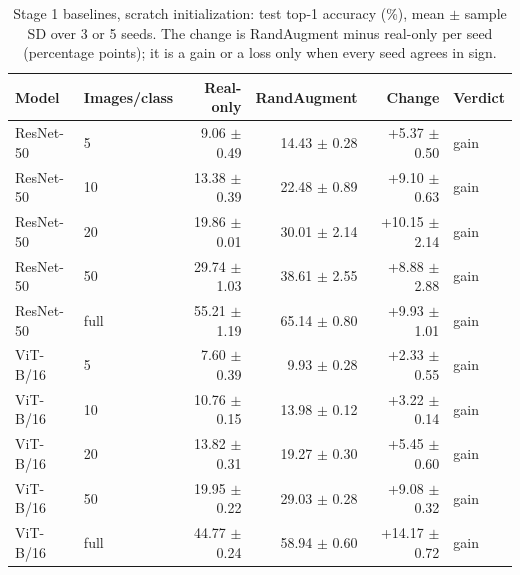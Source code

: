 \begin{table}[H]
\centering
\caption{Stage 1 baselines, scratch initialization: test top-1 accuracy (\%), mean $\pm$ sample SD over 3 or 5 seeds. The change is RandAugment minus real-only per seed (percentage points); it is a gain or a loss only when every seed agrees in sign.}
\label{tab:stage1-scratch-accuracy-test}
\begin{tabular}{llrrrl}
\toprule
Model & Images/class & Real-only & RandAugment & Change & Verdict \\
\midrule
ResNet-50 & 5 & 9.06 $\pm$ 0.49 & 14.43 $\pm$ 0.28 & +5.37 $\pm$ 0.50 & gain \\
ResNet-50 & 10 & 13.38 $\pm$ 0.39 & 22.48 $\pm$ 0.89 & +9.10 $\pm$ 0.63 & gain \\
ResNet-50 & 20 & 19.86 $\pm$ 0.01 & 30.01 $\pm$ 2.14 & +10.15 $\pm$ 2.14 & gain \\
ResNet-50 & 50 & 29.74 $\pm$ 1.03 & 38.61 $\pm$ 2.55 & +8.88 $\pm$ 2.88 & gain \\
ResNet-50 & full & 55.21 $\pm$ 1.19 & 65.14 $\pm$ 0.80 & +9.93 $\pm$ 1.01 & gain \\
\midrule
ViT-B/16 & 5 & 7.60 $\pm$ 0.39 & 9.93 $\pm$ 0.28 & +2.33 $\pm$ 0.55 & gain \\
ViT-B/16 & 10 & 10.76 $\pm$ 0.15 & 13.98 $\pm$ 0.12 & +3.22 $\pm$ 0.14 & gain \\
ViT-B/16 & 20 & 13.82 $\pm$ 0.31 & 19.27 $\pm$ 0.30 & +5.45 $\pm$ 0.60 & gain \\
ViT-B/16 & 50 & 19.95 $\pm$ 0.22 & 29.03 $\pm$ 0.28 & +9.08 $\pm$ 0.32 & gain \\
ViT-B/16 & full & 44.77 $\pm$ 0.24 & 58.94 $\pm$ 0.60 & +14.17 $\pm$ 0.72 & gain \\
\bottomrule
\end{tabular}
\end{table}
